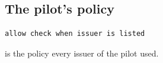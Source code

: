 \appendix
\chapter*{\fuggelek}
\setcounter{chapter}{\appendixnumber}

\section{The pilot's policy}
\begin{lstlisting}[language=Policy, caption={The pilot's revocation policy.}, label={lst:policy}]
allow check when issuer is listed
\end{lstlisting}
 is the policy every issuer of the pilot used.
